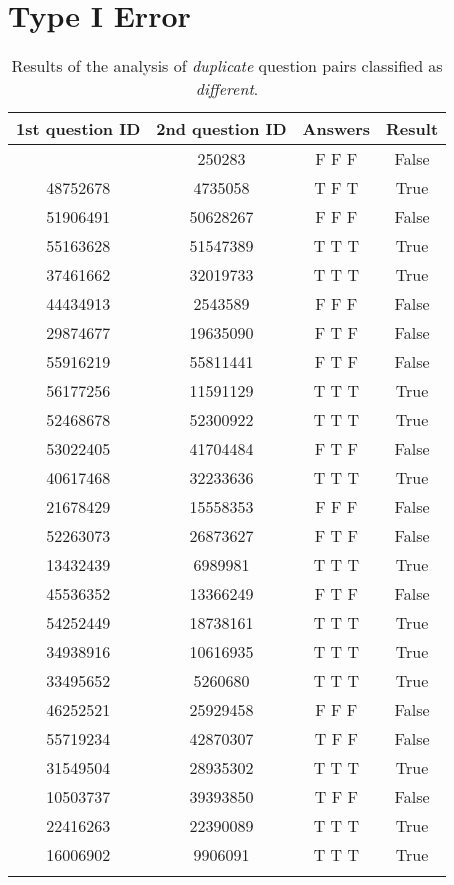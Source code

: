 \section{Type I Error}
\begin{longtable}[c]{c c c c}
	\hline
	\textbf{1st question ID} & \textbf{2nd question ID} & \textbf{Answers} & \textbf{Result} \\ 
	\hline \hline
	\endfirsthead
	\hline
	\endhead
	\hline
	\endfoot
	\endlastfoot
	39665029 & 250283 & F F F & False \\
	48752678 & 4735058 & T F T & True \\
	51906491 & 50628267 & F F F & False \\
	55163628 & 51547389 & T T T & True \\
	37461662 & 32019733 & T T T & True \\
	44434913 & 2543589 & F F F & False \\
	29874677 & 19635090 & F T F & False \\
	55916219 & 55811441 & F T F & False \\
	56177256 & 11591129 & T T T & True \\
	52468678 & 52300922 & T T T & True \\
	53022405 & 41704484 & F T F & False \\
	40617468 & 32233636 & T T T & True \\
	21678429 & 15558353 & F F F & False \\
	52263073 & 26873627 & F T F & False \\
	13432439 & 6989981 & T T T & True \\
	45536352 & 13366249 & F T F & False \\
	54252449 & 18738161 & T T T & True \\
	34938916 & 10616935 & T T T & True \\
	33495652 & 5260680 & T T T & True \\
	46252521 & 25929458 & F F F & False \\
	55719234 & 42870307 & T F F & False \\
	31549504 & 28935302 & T T T & True \\
	10503737 & 39393850 & T F F & False \\
	22416263 & 22390089 & T T T & True \\
	16006902 & 9906091 & T T T & True \\
	\hline
	\caption{Results of the analysis of \textit{duplicate} question pairs classified as \textit{different}. \label{survey_error_i}}\\
\end{longtable}

